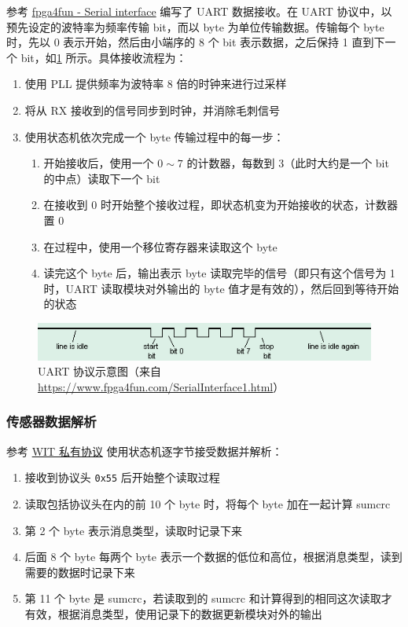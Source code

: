 \documentclass[UTF8, 11pt, fontset=none]{ctexart}
\begin{document}
参考 \href{https://www.fpga4fun.com/SerialInterface.html}{fpga4fun - Serial interface} 编写了 UART 数据接收。在 UART 协议中，以预先设定的波特率为频率传输 bit，而以 byte 为单位传输数据。传输每个 byte 时，先以 0 表示开始，然后由小端序的 8 个 bit 表示数据，之后保持 1 直到下一个 bit，如\cref{uart} 所示。具体接收流程为：

\begin{enumerate}
    \item 使用 PLL 提供频率为波特率 8 倍的时钟来进行过采样
    \item 将从 RX 接收到的信号同步到时钟，并消除毛刺信号
    \item 使用状态机依次完成一个 byte 传输过程中的每一步：
        \begin{enumerate}
            \item 开始接收后，使用一个 $0 \sim 7$ 的计数器，每数到 3（此时大约是一个 bit 的中点）读取下一个 bit
            \item 在接收到 0 时开始整个接收过程，即状态机变为开始接收的状态，计数器置 0
            \item 在过程中，使用一个移位寄存器来读取这个 byte
            \item 读完这个 byte 后，输出表示 byte 读取完毕的信号（即只有这个信号为 1 时，UART 读取模块对外输出的 byte 值才是有效的），然后回到等待开始的状态
        \end{enumerate}
\end{enumerate}

\begin{figure}[H]
    \centering
    \includegraphics[width=\textwidth]{images/uart.png}
    \vspace{-16pt}
    \caption{UART 协议示意图（来自 \url{https://www.fpga4fun.com/SerialInterface1.html}）}
    \label{uart}
\end{figure}

\subsubsection{传感器数据解析}

参考 \href{https://wit-motion.yuque.com/wumwnr/ltst03/vl3tpy}{WIT 私有协议} 使用状态机逐字节接受数据并解析：

\begin{enumerate}
    \item 接收到协议头 \texttt{0x55} 后开始整个读取过程
    \item 读取包括协议头在内的前 10 个 byte 时，将每个 byte 加在一起计算 sumcrc
    \item 第 2 个 byte 表示消息类型，读取时记录下来
    \item 后面 8 个 byte 每两个 byte 表示一个数据的低位和高位，根据消息类型，读到需要的数据时记录下来
    \item 第 11 个 byte 是 sumcrc，若读取到的 sumcrc 和计算得到的相同这次读取才有效，根据消息类型，使用记录下的数据更新模块对外的输出
\end{enumerate}
\end{document}
